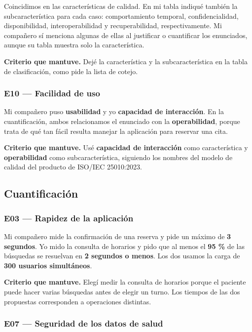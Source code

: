 \documentclass[11pt,a4paper]{article}
\begin{document}
Coincidimos en las características de calidad. En mi tabla indiqué también la
subcaracterística para cada caso: comportamiento temporal, confidencialidad,
disponibilidad, interoperabilidad y recuperabilidad, respectivamente. Mi
compañero sí menciona algunas de ellas al justificar o cuantificar los
enunciados, aunque su tabla muestra solo la característica.

\textbf{Criterio que mantuve.} Dejé la característica y la subcaracterística
en la tabla de clasificación, como pide la lista de cotejo.

\subsubsection*{E10 --- Facilidad de uso}

Mi compañero puso \textbf{usabilidad} y yo \textbf{capacidad de interacción}.
En la cuantificación, ambos relacionamos el enunciado con la
\textbf{operabilidad}, porque trata de qué tan fácil resulta manejar la
aplicación para reservar una cita.

\textbf{Criterio que mantuve.} Usé \textbf{capacidad de interacción} como
característica y \textbf{operabilidad} como subcaracterística, siguiendo los
nombres del modelo de calidad del producto de ISO/IEC 25010:2023.

\subsection{Cuantificación}

\subsubsection*{E03 --- Rapidez de la aplicación}

Mi compañero mide la confirmación de una reserva y pide un máximo de
\textbf{3 segundos}. Yo mido la consulta de horarios y pido que al menos el
\textbf{95 \%} de las búsquedas se resuelvan en \textbf{2 segundos o menos}.
Los dos usamos la carga de \textbf{300 usuarios simultáneos}.

\textbf{Criterio que mantuve.} Elegí medir la consulta de horarios porque el
paciente puede hacer varias búsquedas antes de elegir un turno. Los tiempos
de las dos propuestas corresponden a operaciones distintas.

\subsubsection*{E07 --- Seguridad de los datos de salud}
\end{document}
